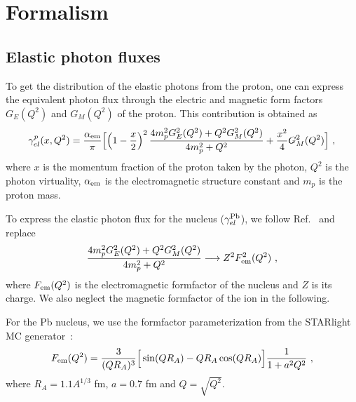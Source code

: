 \section{Formalism}

\subsection{Elastic photon fluxes}

To get the distribution of the elastic photons from the proton, one can express the equivalent photon flux through
the electric and magnetic form factors $G_E(Q^2)$ and $G_M(Q^2)$ of the proton.
This contribution is obtained as
\begin{eqnarray}
  \gamma^{p}_{el}(x,Q^2) = \frac{\alpha_{\rm{em}}}{\pi}
\Big[ \Big( 1- {x \over 2} \Big)^2 \, {4 m_p^2 G_E^2(Q^2) + Q^2 G_M^2(Q^2) \over 4m_p^2 + Q^2} + {x^2 \over 4} G_M^2(Q^2) \Big]~,
\label{proton_el_flux}
\end{eqnarray}
where $x$ is the momentum fraction of the proton taken by the photon, $Q^2$ is the photon virtuality, $\alpha_{\rm{em}}$ is the electromagnetic structure constant and $m_p$ is the proton mass.

To express the elastic photon flux for the nucleus ($\gamma^{\rm Pb}_{el}$), we follow Ref.~\cite{Budnev:1974de} and replace 
\begin{eqnarray}
 {4 m_p^2 G_E^2(Q^2) + Q^2 G_M^2(Q^2) \over 4m_p^2 + Q^2} \longrightarrow Z^2 F_{\rm em}^2(Q^2)~,
 \end{eqnarray}
where $F_{\rm em}(Q^2)$ is the electromagnetic formfactor of the nucleus and $Z$ is its charge.
We also neglect the magnetic formfactor of the ion in the following.

For the Pb nucleus, we use the formfactor parameterization from the STARlight MC generator~\cite{Klein:2016yzr}:
\begin{eqnarray}
 F_{\rm em}(Q^2) = {3 \over (QR_A)^3}\Big[ \sin(QR_A) - QR_A \cos(QR_A) \Big] { 1 \over 1 + a^2 Q^2}~,
\end{eqnarray}
where $R_A = 1.1 A^{1/3}$ fm, $a = 0.7$ fm and $Q = \sqrt{Q^2}$.

